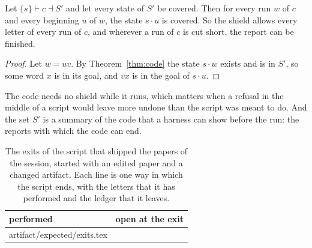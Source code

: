 \documentclass[acmsmall,nonacm,screen]{acmart}
\makeatletter
\newcommand{\rows}[1]{\@@input artifact/expected/#1.tex }
\makeatother
\begin{document}
\begin{theorem}
\label{thm:erase}
Let $\{s\} \vdash c \dashv S'$ and let every state of $S'$ be covered. Then for every run $w$
of $c$ and every beginning $u$ of $w$, the state $s \cdot u$ is covered. So the shield
allows every letter of every run of $c$, and wherever a run of $c$ is cut short, the report
can be finished.
\end{theorem}

\begin{proof}
Let $w = uv$. By Theorem~\ref{thm:code} the state $s \cdot w$ exists and is in $S'$, so some
word $x$ is in its goal, and $vx$ is in the goal of $s \cdot u$.
\end{proof}

The code needs no shield while it runs, which matters when a refusal in the middle of a
script would leave more undone than the script was meant to do. And the set $S'$ is a
summary of the code that a harness can show before the run: the reports with which the code
can end.

\begin{table}
\caption{The exits of the script that shipped the papers of the session, started with an
edited paper and a changed artifact. Each line is one way in which the script ends, with
the letters that it has performed and the ledger that it leaves.}
\label{tab:exits}
\begin{tabular}{ll}
\toprule
performed & open at the exit \\
\midrule
\rows{exits}
\bottomrule
\end{tabular}
\end{table}
\end{document}

